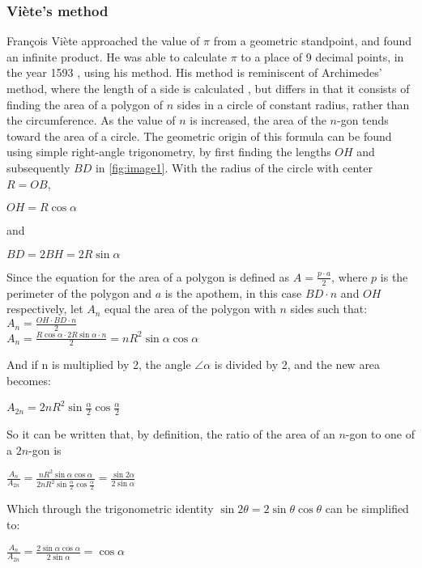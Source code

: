 \subsubsection{Viète's method}

François Viète approached the value of $\pi$ from a 
geometric standpoint, and found an infinite product. 
He was able to calculate $\pi$ to a place of 9 decimal points, in 
the year 1593 \cite{Kreminski}, using his method. His method is reminiscent 
of Archimedes' method, where the length of a side is calculated \cite{archimedespi}, 
but differs in that it consists of finding the area of a polygon of $n$ sides in a circle of constant 
radius, rather than the circumference. As the value of $n$ is increased, the area of the $n$-gon 
tends toward the area of a circle. The geometric origin of this formula 
can be found using simple right-angle trigonometry, by first finding 
the lengths $OH$ and subsequently $BD$ in \ref{fig:image1}.
With the radius of the circle with center $R = OB$,

$OH = R \cos{\alpha}$ 

and

$BD = 2BH = 2 R \sin{\alpha}$

Since the equation for the area of a polygon is defined as $A = \frac{p \cdot a}{2}$, 
where $p$ is the perimeter of the polygon and $a$ is the apothem, in this case $BD \cdot n$ 
and $OH$ respectively, let $A_{n}$ equal the area of 
the polygon with $n$ sides such that: \\
$A_{n} = \frac{OH \cdot BD \cdot n}{2}$ \\
$A_{n} = \frac{R \cos{\alpha} \cdot 2 R \sin{\alpha} \cdot n}{2} = n R^2 \sin{\alpha} \cos{\alpha}$

And if n is multiplied by 2, the angle $\angle \alpha$ is divided by 2, 
and the new area becomes: 

$A_{2n} = 2n R^2 \sin{\frac{\alpha}{2}} \cos{\frac{\alpha}{2}}$

So it can be written that, by definition, the ratio of 
the area of an $n$-gon to one of a $2n$-gon is

$\frac{A_{n}}{A_{2n}} = \frac{n R^2 \sin{\alpha} \cos{\alpha}}{2 n R^2 \sin{\frac{\alpha}{2}} \cos{\frac{\alpha}{2}}} = \frac{\sin{2 \alpha}}{2 \sin{\alpha}}$

Which through the trigonometric identity $\sin{2 \theta} = 2\sin{\theta} \cos{\theta}$ can 
be simplified to:

$\frac{A_{n}}{A_{2n}} = \frac{2\sin{\alpha} \cos{\alpha} }{2\sin{\alpha}}  = \cos{\alpha}$


